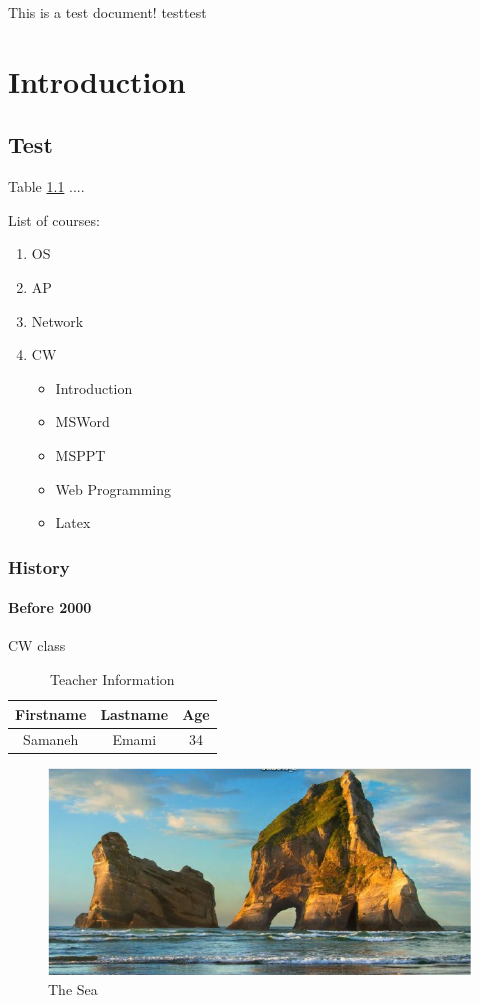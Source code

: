 \documentclass{book}
\begin{document}
\tableofcontents
This is a test document! \hspace{1cm} testtest

\newpage
\chapter{Introduction}

\section{Test}
Table \ref{tab:table1} ....

List of courses:
\begin{enumerate}
    \item OS
    \item AP
    \item Network
    \item CW
    \begin{itemize}
        \item Introduction
        \item MSWord
        \item MSPPT
        \item Web Programming
        \item Latex
    \end{itemize}
\end{enumerate}
\subsection{History}
\subsubsection{Before 2000}
CW class
\begin{table}[h]
    \centering
    \begin{tabular}{|c|c|c|}
         \hline
         Firstname & Lastname & Age \\
         \hline
         Samaneh   & Emami    & 34 \\
         \hline
    \end{tabular}
    \caption{Teacher Information}
    \label{tab:table1}
\end{table}

\newpage
\begin{figure}[t]
    \centering
    \includegraphics[width=\textwidth]{Capture.PNG}
    \caption{The Sea}
    \label{fig:sea}
\end{figure}
\end{document}
